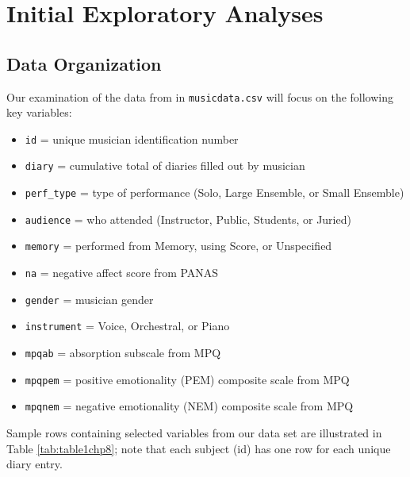 \documentclass[
]{krantz}
\providecommand{\tightlist}{%
  \setlength{\itemsep}{0pt}\setlength{\parskip}{0pt}}
\begin{document}
\hypertarget{explore}{%
\section{Initial Exploratory Analyses}\label{explore}}

\hypertarget{organizedata1}{%
\subsection{Data Organization}\label{organizedata1}}

Our examination of the data from \citet{Miller2010} in \texttt{musicdata.csv} will focus on the following key variables:

\begin{itemize}
\tightlist
\item
  \texttt{id} = unique musician identification number
\item
  \texttt{diary} = cumulative total of diaries filled out by musician
\item
  \texttt{perf\_type} = type of performance (Solo, Large Ensemble, or Small Ensemble)
\item
  \texttt{audience} = who attended (Instructor, Public, Students, or Juried)
\item
  \texttt{memory} = performed from Memory, using Score, or Unspecified
\item
  \texttt{na} = negative affect score from PANAS
\item
  \texttt{gender} = musician gender
\item
  \texttt{instrument} = Voice, Orchestral, or Piano
\item
  \texttt{mpqab} = absorption subscale from MPQ
\item
  \texttt{mpqpem} = positive emotionality (PEM) composite scale from MPQ
\item
  \texttt{mpqnem} = negative emotionality (NEM) composite scale from MPQ
\end{itemize}

Sample rows containing selected variables from our data set are illustrated in Table \ref{tab:table1chp8}; note that each subject (id) has one row for each unique diary entry.
\end{document}
